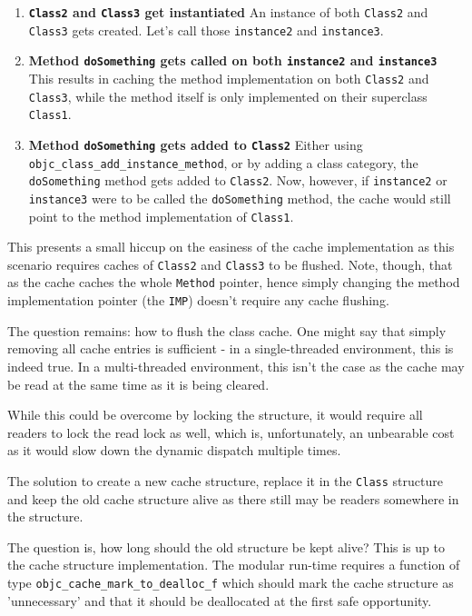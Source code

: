 \begin{enumerate}
  \item{\bf{\verb=Class2= and \verb=Class3= get instantiated}} An instance of both \verb=Class2= and \verb=Class3= gets created. Let's call those \verb=instance2= and \verb=instance3=.
  \item{\bf{Method \verb=doSomething= gets called on both \verb=instance2= and \verb=instance3=}} This results in caching the method implementation on both \verb=Class2= and \verb=Class3=, while the method itself is only implemented on their superclass \verb=Class1=.
  \item{\bf{Method \verb=doSomething= gets added to \verb=Class2=}} Either using \newline{}\verb=objc_class_add_instance_method=, or by adding a class category, the \verb=doSomething= method gets added to \verb=Class2=. Now, however, if \verb=instance2= or \verb=instance3= were to be called the \verb=doSomething= method, the cache would still point to the method implementation of \verb=Class1=.
\end{enumerate}

This presents a small hiccup on the easiness of the cache implementation as this scenario requires caches of \verb=Class2= and \verb=Class3= to be flushed. Note, though, that as the cache caches the whole \verb=Method= pointer, hence simply changing the method implementation pointer (the \verb=IMP=) doesn't require any cache flushing.

The question remains: how to flush the class cache. One might say that simply removing all cache entries is sufficient - in a single-threaded environment, this is indeed true. In a multi-threaded environment, this isn't the case as the cache may be read at the same time as it is being cleared.

While this could be overcome by locking the structure, it would require all readers to lock the read lock as well, which is, unfortunately, an unbearable cost as it would slow down the dynamic dispatch multiple times.

The solution to create a new cache structure, replace it in the \verb=Class= structure and keep the old cache structure alive as there still may be readers somewhere in the structure.

The question is, how long should the old structure be kept alive? This is up to the cache structure implementation. The modular run-time requires a function of type \verb=objc_cache_mark_to_dealloc_f= which should mark the cache structure as 'unnecessary' and that it should be deallocated at the first safe opportunity.

